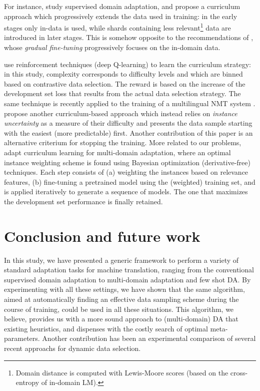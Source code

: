 \documentclass[11pt]{article}
\newcommand{\fyTodo}[1]{\Todo[FY:]{\textcolor{orange}{#1}}}
\newcommand{\fyDone}[1]{\done[FY]\Todo[FY:]{\textcolor{orange}{#1}}}
\begin{document}
For instance, \citet{Zhang19curriculum} study supervised domain adaptation, and propose a curriculum approach which progressively extends the data used in training: in the early stages only in-data is used, while shards containing less relevant\footnote{Domain distance is computed with Lewis-Moore scores (based on the cross-entropy of in-domain LM).} data are introduced in later stages. This is somehow opposite to the recommendations of \citet{Vanderwees17dynamic}, whose \emph{gradual fine-tuning} progressively focuses on the in-domain data.\fyTodo{These have not been compared? and also to what we do ?} 

\citet{Kumar19reinforcement} use reinforcement techniques (deep Q-learning) to learn the curriculum strategy: in this study, complexity corresponds to difficulty levels and which are binned based on contrastive data selection. The reward is based on the increase of the development set loss that results from the actual data selection strategy.\fyTodo{Alert: what do we do during warm-up ?} The same technique is recently applied to the training of a multilingual NMT system \citep{Kumar21learning}. \citet{Zhou20uncertainty} propose another curriculum-based approach which instead relies on \emph{instance uncertainty} as a measure of their difficulty and presents the data sample starting with the easiest (more predictable) first. Another contribution of this paper is an alternative criterium for stopping the training. More related to our problems, \citet{Wang20learning-multi} adapt curriculum learning for multi-domain adaptation, where an optimal instance weighting scheme is found using Bayesian optimization (derivative-free) techniques. Each step consists of (a) weighting the instances based on relevance features, (b) fine-tuning a pretrained model using the (weighted) training set, and is applied iteratively to generate a sequence of models. The one that maximizes the development set performance is finally retained.

\section{Conclusion and future work}

\fyDone{Write conclusion}
In this study, we have presented a generic framework to perform a variety of standard adaptation tasks for machine translation, ranging from the conventional supervised domain adaptation to multi-domain adaptation and few shot DA. By experimenting with all these settings, we have shown that the same algorithm, aimed at automatically finding an effective data sampling scheme during  the course of training, could be used in all these situations. This algorithm, we believe, provides us with a more sound approach to (multi-domain) DA that existing heuristics, and dispenses with the costly search of optimal meta-parameters. Another contribution has been an experimental comparison of several recent approachs for dynamic data selection. 
\end{document}
